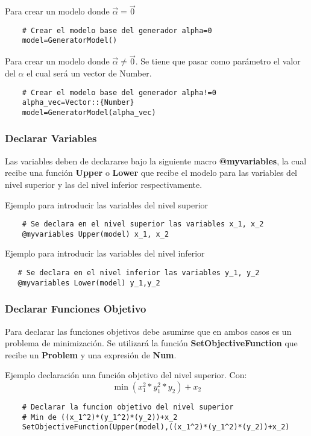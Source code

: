 Para crear un modelo donde $\vec{\alpha}=\vec{0}$
\begin{lstlisting}
    # Crear el modelo base del generador alpha=0
    model=GeneratorModel()
\end{lstlisting}

Para crear un modelo donde $\vec{\alpha}\neq \vec{0}$.
Se tiene que pasar como parámetro el valor del $\alpha$
el cual será un vector de Number.
\begin{lstlisting}
    # Crear el modelo base del generador alpha!=0
    alpha_vec=Vector::{Number}
    model=GeneratorModel(alpha_vec)
\end{lstlisting}

\subsubsection{Declarar Variables}
Las variables deben de 
declararse bajo la siguiente macro \textbf{@myvariables}, la cual 
recibe una función \textbf{Upper} o \textbf{Lower} que recibe el modelo
para las variables del nivel superior y las del nivel inferior respectivamente.

Ejemplo para introducir las variables del nivel superior
\begin{lstlisting}
    # Se declara en el nivel superior las variables x_1, x_2
    @myvariables Upper(model) x_1, x_2
\end{lstlisting}

Ejemplo para introducir las variables del nivel inferior
\begin{lstlisting}
   # Se declara en el nivel inferior las variables y_1, y_2
   @myvariables Lower(model) y_1,y_2
\end{lstlisting}


\subsubsection{Declarar Funciones Objetivo}

Para declarar las funciones objetivos debe asumirse que en ambos casos es un 
problema de minimización. Se utilizará la función \textbf{SetObjectiveFunction}
que recibe un \textbf{Problem} y una expresión de \textbf{Num}.

Ejemplo declaración una función objetivo del nivel superior.
Con: $$\min (x_1^2*y_1^2*y_2) + x_2$$
\begin{lstlisting}
    # Declarar la funcion objetivo del nivel superior
    # Min de ((x_1^2)*(y_1^2)*(y_2))+x_2
    SetObjectiveFunction(Upper(model),((x_1^2)*(y_1^2)*(y_2))+x_2)
\end{lstlisting}

